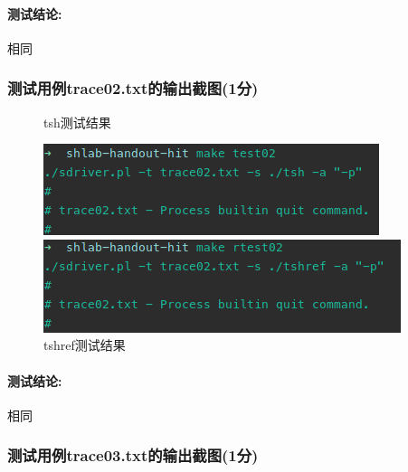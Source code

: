 \paragraph{测试结论:}相同

\subsubsection{测试用例trace02.txt的输出截图(1分)}

\begin{figure}[H]
    \begin{minipage}[c]{0.5\linewidth}
        \centering
        \caption{tsh测试结果}
        \includegraphics[width=0.7\linewidth]{figures/test02.png}
    \end{minipage}
    \begin{minipage}[c]{0.5\linewidth}
        \centering
        \caption{tshref测试结果}
        \includegraphics[width=0.7\linewidth]{figures/rtest02.png}
    \end{minipage}
\end{figure}

\paragraph{测试结论:}相同

\subsubsection{测试用例trace03.txt的输出截图(1分)}


